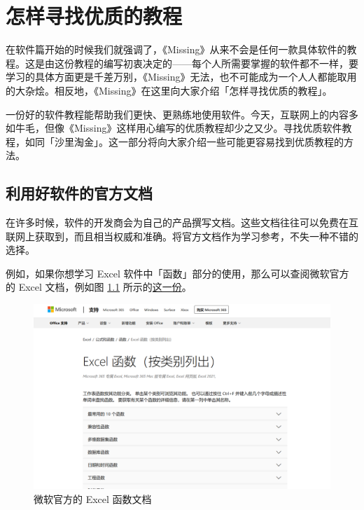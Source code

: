 \chapter{怎样寻找优质的教程}
\label{how-to-find-tutorials}

\begin{intro}
  在软件篇开始的时候我们就强调了，《Missing》从来不会是任何一款具体软件的教程。这是由这份教程的编写初衷决定的——每个人所需要掌握的软件都不一样，要学习的具体方面更是千差万别，《Missing》无法，也不可能成为一个人人都能取用的大杂烩。相反地，《Missing》在这里向大家介绍「怎样寻找优质的教程」。
\end{intro}

一份好的软件教程能帮助我们更快、更熟练地使用软件。今天，互联网上的内容多如牛毛，但像《Missing》这样用心编写的优质教程却少之又少。寻找优质软件教程，如同「沙里淘金」。这一部分将向大家介绍一些可能更容易找到优质教程的方法。

\section{利用好软件的官方文档}

在许多时候，软件的开发商会为自己的产品撰写文档。这些文档往往可以免费在互联网上获取到，而且相当权威和准确。将官方文档作为学习参考，不失一种不错的选择。

例如，如果你想学习 Excel 软件中「函数」部分的使用，那么可以查阅微软官方的 Excel 文档，例如图 \ref{MS_Excel_functions} 所示的\href{https://support.microsoft.com/zh-cn/office/excel-%E5%87%BD%E6%95%B0-%E6%8C%89%E7%B1%BB%E5%88%AB%E5%88%97%E5%87%BA-5f91f4e9-7b42-46d2-9bd1-63f26a86c0eb}{这一份}。

\begin{figure}[htb!]
  \centering
  \includegraphics[width=12cm]{assets/MS_Excel_functions.png}
  \caption{微软官方的 Excel 函数文档}
  \label{MS_Excel_functions}
\end{figure}

